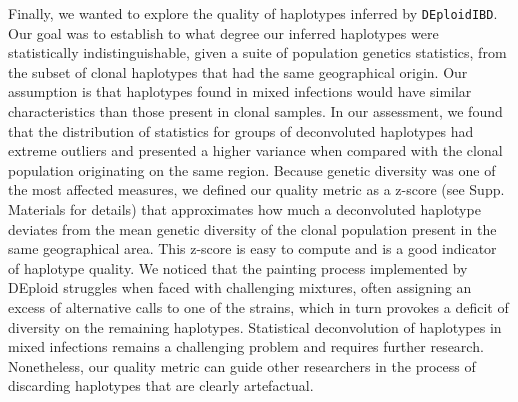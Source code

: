 \documentclass[9pt,lineno]{elife}
\begin{document}
Finally, we wanted to explore the quality of haplotypes inferred by \texttt{DEploidIBD}. Our goal was to establish to what degree our inferred haplotypes were statistically indistinguishable, given a suite of population genetics statistics, from the subset of clonal haplotypes that had the same geographical origin. Our assumption is that haplotypes found in mixed infections would have similar characteristics than those present in clonal samples. In our assessment, we found that the distribution of statistics for groups of deconvoluted haplotypes had extreme outliers and presented a higher variance when compared with the clonal population originating on the same region. Because genetic diversity was one of the most affected measures, we defined our quality metric as a z-score (see Supp. Materials for details) that approximates how much a deconvoluted haplotype deviates from the mean genetic diversity of the clonal population present in the same geographical area. This z-score is easy to compute and is a good indicator of haplotype quality. We noticed that the painting process implemented by DEploid struggles when faced with challenging mixtures, often assigning an excess of alternative calls to one of the strains, which in turn provokes a deficit of diversity on the remaining haplotypes. Statistical deconvolution of haplotypes in mixed infections remains a challenging problem and requires further research. Nonetheless, our quality metric can guide other researchers in the process of discarding haplotypes that are clearly artefactual.
\end{document}
